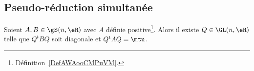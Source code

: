 \subsection{Pseudo-réduction simultanée}

\begin{corollary}  \label{CorNHKnLVA}
    Soient \( A,B\in \gS(n,\eR)\) avec \( A\) définie positive\footnote{Définition~\ref{DefAWAooCMPuVM}.}. Alors il existe \( Q\in \GL(n,\eR)\) telle que \( Q^tBQ\) soit diagonale et \( Q^tAQ=\mtu\).
\end{corollary}

